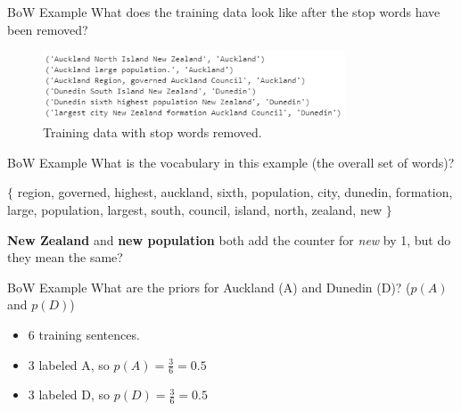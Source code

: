 \documentclass[aspectratio=169, 10pt]{beamer}
\begin{document}
\begin{frame}{BoW Example}
 What does the training data look like after the stop words have been removed?
 \pause
    \begin{figure}
        \centering
        \includegraphics[width=0.8\textwidth]{../imgs/sentence_nostop.png}
        \caption{Training data with stop words removed.}
    \end{figure}
\end{frame}

\begin{frame}{BoW Example}
    What is the vocabulary in this example (the overall set of words)?\\
    \vspace{1em}
    
    $\{$ region, governed, highest, auckland, sixth, population, city, dunedin, formation, large, population, largest, south, council, island, north, zealand, new $\}$\\
    \vspace{1em}

    \textbf{New Zealand} and \textbf{new population} both add the counter for \textit{new} by 1, but do they mean the same?
\end{frame}

\begin{frame}{BoW Example}
    What are the priors for Auckland (A) and Dunedin (D)? ($p(A)$ and $p(D)$)
    \pause
    \begin{itemize}
        \item 6 training sentences.
        \item 3 labeled A, so $p(A) = \frac{3}{6} = 0.5$
        \item 3 labeled D, so $p(D) = \frac{3}{6} = 0.5$
    \end{itemize}
\end{frame}
\end{document}
